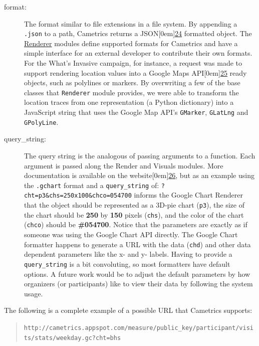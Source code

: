 \documentclass[10pt,a4paper,english]{article}
\begin{document}
\begin{description}
\item[{format:}] \leavevmode 
The format similar to file extensions in a file system. By appending a \texttt{.json} to a path, Cametrics returns a JSON\raisebox{.5em}[0em]{\scriptsize\hyperlink{id52}{24}} formatted object. The \href{\#renderer}{Renderer} modules define supported formats for Cametrics and have a simple interface for an external developer to contribute their own formats. For the What's Invasive campaign, for instance, a request was made to support rendering location values into a Google Maps API\raisebox{.5em}[0em]{\scriptsize\hyperlink{id53}{25}} ready objects, such as polylines or markers. By overwriting a few of the base classes that \texttt{Renderer} module provides, we were able to transform the location traces from one representation (a Python dictionary) into a JavaScript string that uses the Google Map API's \texttt{GMarker}, \texttt{GLatLng} and \texttt{GPolyLine}.

\item[{query{\_}string:}] \leavevmode 
The query string is the analogous of passing arguments to a function. Each argument is passed along the Render and Visuals modules. More documentation is available on the website\raisebox{.5em}[0em]{\scriptsize\hyperlink{id54}{26}}, but as an example using the \texttt{.gchart} format and a \texttt{query{\_}string} of: \texttt{?cht=p3{\&}chs=250x100{\&}chco=054700} informs the Google Chart Renderer that the object should be represented as a 3D-pie chart (\texttt{p3}), the size of the chart should be \textbf{250} by \textbf{150} pixels (\texttt{chs}), and the color of the chart (\texttt{chco}) should be \textbf{{\#}054700}. Notice that the parameters are exactly as if someone was using the Google Chart API directly. The Google Chart formatter happens to generate a URL with the data (\texttt{chd}) and other data dependent parameters like the x- and y- labels. Having to provide a \texttt{query{\_}string} is a bit convoluting, so most formatters have default options. A future work would be to adjust the default parameters by how organizers (or participants) like to view their data by following the system usage.

\end{description}

The following is a complete example of a possible URL that Cametrics supports:
\begin{quote}

\texttt{http://cametrics.appspot.com/measure/public{\_}key/participant/visits/stats/weekday.gc?cht=bhs}
\end{quote}
\end{document}
